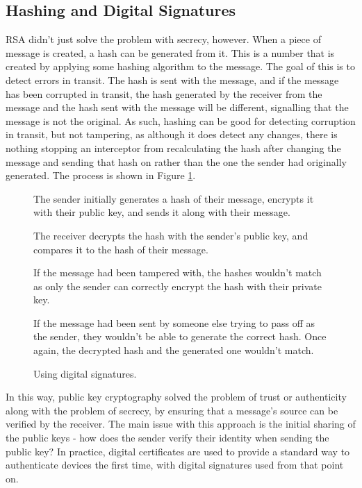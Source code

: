 \documentclass[a4paper,12pt]{report}
\begin{document}
    \subsection{Hashing and Digital Signatures}
RSA didn't just solve the problem with secrecy, however. When a piece of message
is created, a hash can be generated from it. This is a number that is created by
applying some hashing algorithm to the message. The goal of this is to detect
errors in transit. The hash is sent with the message, and if the message has
been corrupted in transit, the hash generated by the receiver from the message
and the hash sent with the message will be different, signalling that the
message is not the original. As such, hashing can be good for detecting
corruption in transit, but not tampering, as although it does detect any
changes, there is nothing stopping an interceptor from recalculating the hash
after changing the message and sending that hash on rather than the one the
sender had originally generated. The process is shown in Figure
\ref{fig:signatures}.
    \begin{figure}[h!]
    \begin{center}
 \item The sender initially generates a hash of their message, encrypts it with
 their public key, and sends it along with their message.
 \item The receiver decrypts the hash with the sender's public key, and compares
 it to the hash of their message.
 \item If the message had been tampered with, the hashes wouldn't match as
 only the sender can correctly encrypt the hash with their private key.
 \item If the message had been sent by someone else trying to pass off as the
 sender, they wouldn't be able to generate the correct hash. Once again, the
 decrypted hash and the generated one wouldn't match.
    \end{center}
      \caption{Using digital signatures.}
      \label{fig:signatures}
    \end{figure}
In this way, public key cryptography solved the problem of trust or authenticity
along with the problem of secrecy, by ensuring that a message's source can be
verified by the receiver. The main issue with this approach is the initial
sharing of the public keys - how does the sender verify their identity when
sending the public key? In practice, digital certificates are used to provide a
standard way to authenticate devices the first time, with digital signatures
used from that point on\cite{singh}.
  
\end{document}
